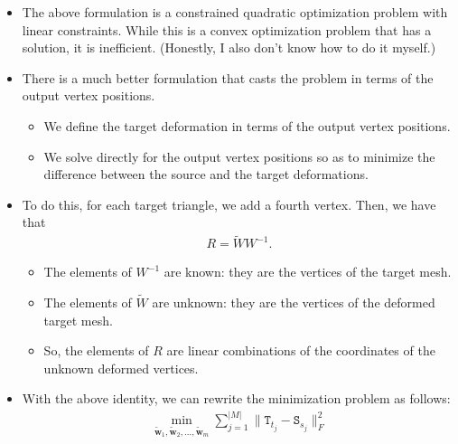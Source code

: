 \documentclass[10pt]{article}
\newcommand{\ve}[1]{\mathbf{#1}}
\newcommand{\mtt}[1]{\mathtt{#1}}
\begin{document}
\begin{itemize}
    \item The above formulation is a constrained quadratic optimization problem with linear constraints. While this is a convex optimization problem that has a solution, it is inefficient. (Honestly, I also don't know how to do it myself.)
    
    \item There is a much better formulation that casts the problem in terms of the output vertex positions.
    \begin{itemize}
        \item We define the target deformation in terms of the output vertex positions.
        \item We solve directly for the output vertex positions so as to minimize the difference between the source and the target deformations.
    \end{itemize}

    \item To do this, for each target triangle, we add a fourth vertex. Then, we have that
    \begin{align*}
        R = \widetilde{W} W^{-1}.
    \end{align*}
    \begin{itemize}
        \item The elements of $W^{-1}$ are known: they are the vertices of the target mesh. 
        \item The elements of $\widetilde{W}$ are unknown: they are the vertices of the deformed target mesh. 
        \item So, the elements of $R$ are linear combinations of the coordinates of the unknown deformed vertices.
    \end{itemize}
    
    \item With the above identity, we can rewrite the minimization problem as follows:    
    \begin{align*}
        \min_{\widetilde{\ve{w}}_1, \widetilde{\ve{w}}_2, \ldots, \widetilde{\ve{w}}_m} 
        \sum_{j=1}^{|M|} \| \mtt{T}_{t_j} - \mtt{S}_{s_j}  \|_F^2
    \end{align*}


\end{itemize}
\end{document}
